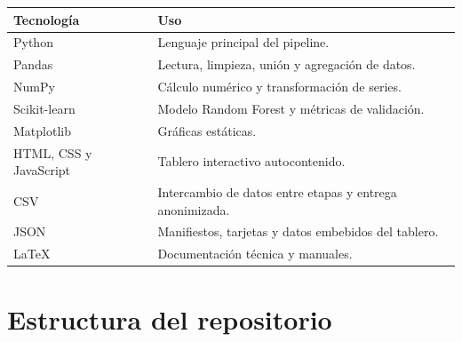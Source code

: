 \documentclass[11pt,a4paper]{article}
\begin{document}
\begin{longtable}{p{}p{}}
\toprule
\textbf{Tecnología} & \textbf{Uso}\\
\midrule
Python & Lenguaje principal del pipeline.\\
Pandas & Lectura, limpieza, unión y agregación de datos.\\
NumPy & Cálculo numérico y transformación de series.\\
Scikit-learn & Modelo Random Forest y métricas de validación.\\
Matplotlib & Gráficas estáticas.\\
HTML, CSS y JavaScript & Tablero interactivo autocontenido.\\
CSV & Intercambio de datos entre etapas y entrega anonimizada.\\
JSON & Manifiestos, tarjetas y datos embebidos del tablero.\\
LaTeX & Documentación técnica y manuales.\\
\bottomrule
\end{longtable}

\section{Estructura del repositorio}
\end{document}
